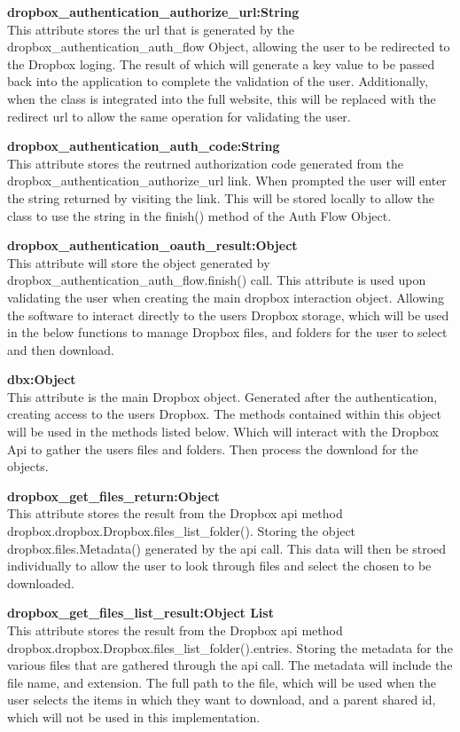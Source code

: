 \textbf{dropbox\_authentication\_authorize\_url:String} \\
    This attribute stores the url that is generated by the dropbox\_authentication\_auth\_flow Object, allowing the user
    to be redirected to the Dropbox loging. The result of which will generate a key value to be passed back into the application
    to complete the validation of the user. Additionally, when the class is integrated into the full website, this will be replaced
    with the redirect url to allow the same operation for validating the user.

\textbf{dropbox\_authentication\_auth\_code:String} \\
    This attribute stores the reutrned authorization code generated from the dropbox\_authentication\_authorize\_url link. When
    prompted the user will enter the string returned by visiting the link. This will be stored locally to allow the class to use the
    string in the finish() method of the Auth Flow Object. 

\textbf{dropbox\_authentication\_oauth\_result:Object} \\
    This attribute will store the object generated by dropbox\_authentication\_auth\_flow.finish() call. This attribute is used upon validating
    the user when creating the main dropbox interaction object. Allowing the software to interact directly to the users Dropbox storage, 
    which will be used in the below functions to manage Dropbox files, and folders for the user to select and then download. 

\textbf{dbx:Object} \\
    This attribute is the main Dropbox object. Generated after the authentication, creating access to the users Dropbox. The methods contained 
    within this object will be used in the methods listed below. Which will interact with the Dropbox Api to gather the users files and folders.
    Then process the download for the objects. 

\textbf{dropbox\_get\_files\_return:Object} \\
    This attribute stores the result from the Dropbox api method dropbox.dropbox.Dropbox.files\_list\_folder(). Storing the object 
    dropbox.files.Metadata() generated by the api call. This data will then be stroed individually to allow the user to look through 
    files and select the chosen to be downloaded.

\textbf{dropbox\_get\_files\_list\_result:Object List} \\
    This attribute stores the result from the Dropbox api method dropbox.dropbox.Dropbox.files\_list\_folder().entries. Storing the metadata for 
    the various files that are gathered through the api call. The metadata will include the file name, and extension. The full path to the file, 
    which will be used when the user selects the items in which they want to download, and a parent shared id, which will not be used in this 
    implementation.

